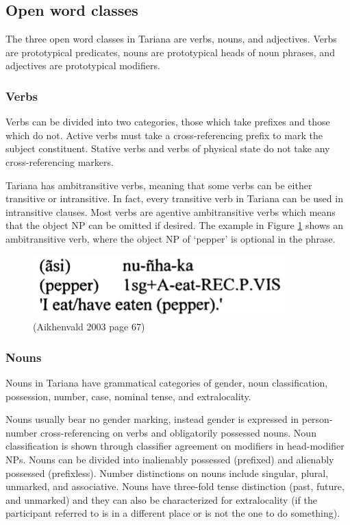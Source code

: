 \documentclass{article}
\begin{document}
\subsection{Open word classes}
The three open word classes in Tariana are verbs, nouns, and adjectives. Verbs are prototypical predicates, nouns are prototypical heads of noun phrases, and adjectives are prototypical modifiers.
\subsubsection{Verbs}
Verbs can be divided into two categories, those which take prefixes and those which do not. Active verbs must take a cross-referencing prefix to mark the subject constituent. Stative verbs and verbs of physical state do not take any cross-referencing markers.

Tariana has ambitransitive verbs, meaning that some verbs can be either transitive or intransitive. In fact, every transitive verb in Tariana can be used in intransitive clauses. Most verbs are agentive ambitransitive verbs which means that the object NP can be omitted if desired. The example in Figure \ref*{eatpepper} shows an ambitransitive verb, where the object NP of `pepper' is optional in the phrase.

\begin{figure}[h!]
\centering
\includegraphics[scale = 0.38]{eatpepper.png}
	\caption{(Aikhenvald 2003 page 67)}
	\label{eatpepper}
\end{figure}

\subsubsection{Nouns}
Nouns in Tariana have grammatical categories of gender, noun classification, possession, number, case, nominal tense, and extralocality.

Nouns usually bear no gender marking, instead gender is expressed in person-number cross-referencing on verbs and obligatorily possessed nouns. Noun classification is shown through classifier agreement on modifiers in head-modifier NPs. Nouns can be divided into inalienably possessed (prefixed) and alienably possessed (prefixless). Number distinctions on nouns include singular, plural, unmarked, and associative. Nouns have three-fold tense distinction (past, future, and unmarked) and they can also be characterized for extralocality (if the participant referred to is in a different place or is not the one to do something).
\end{document}
